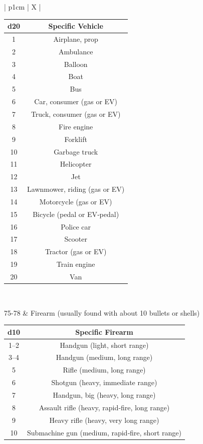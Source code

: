 \begin{xltabular}{\textwidth}{| p{1cm} | X |}
{\begin{tabular}{| c | c |}
  \textbf{d20} & \textbf{Specific Vehicle} \\ \hline 
  1 & Airplane, prop  \\ \hline
  2 & Ambulance  \\ \hline
  3 & Balloon  \\ \hline
  4 & Boat  \\ \hline
  5 & Bus  \\ \hline
  6 & Car, consumer (gas or EV)  \\ \hline
  7 & Truck, consumer (gas or EV) \\ \hline 
  8 & Fire engine  \\ \hline
  9 & Forklift  \\ \hline
  10 & Garbage truck  \\ \hline
  11 & Helicopter  \\ \hline
  12 & Jet  \\ \hline
  13 & Lawnmower, riding (gas or EV)  \\ \hline
  14 & Motorcycle (gas or EV)  \\ \hline
  15 & Bicycle (pedal or EV‑pedal) \\ \hline 
  16 & Police car  \\ \hline
  17 & Scooter  \\ \hline
  18 & Tractor (gas or EV) \\ \hline 
  19 & Train engine  \\ \hline
  20 & Van  \\ \hline
  
  \end{tabular}} \\ \hline
  
75-78 & Firearm (usually found with about 10 bullets or shells)  \par
   \parbox[t]{\linewidth}{ %
   \begin{tabular}{| c | c |} \hline

   \textbf{d10} & \textbf{Specific Firearm} \\ \hline

   1–2 & Handgun (light, short range)  \\ \hline
   3–4 & Handgun (medium, long range)  \\ \hline
   5 & Rifle (medium, long range)  \\ \hline
   6 & Shotgun (heavy, immediate range)  \\ \hline
   7 & Handgun, big (heavy, long range)  \\ \hline
   8 & Assault rifle (heavy, rapid‑fire, long range)  \\ \hline
   9 & Heavy rifle (heavy, very long range)  \\ \hline
   10 & Submachine gun (medium, rapid‑fire, short range)  \\ \hline


\end{tabular}}
\end{xltabular}
